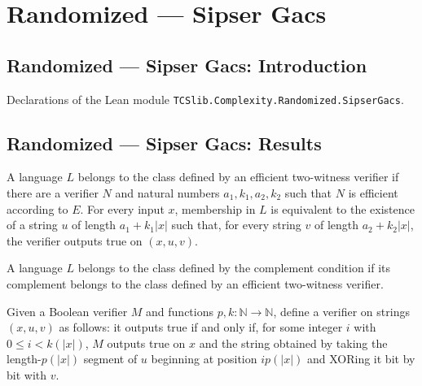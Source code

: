 \section{Randomized --- Sipser Gacs}
\subsection*{Randomized --- Sipser Gacs: Introduction}

Declarations of the Lean module \texttt{TCSlib.Complexity.Randomized.SipserGacs}.

\subsection*{Randomized --- Sipser Gacs: Results}

\begin{definition}
\label{Randomized.InSigma2}
\leanok
{}
A language $L$ belongs to the class defined by an efficient two-witness verifier if
there are a verifier $N$ and natural numbers $a_1,k_1,a_2,k_2$ such that $N$ is
efficient according to $E$. For every input $x$, membership in $L$ is equivalent to the
existence of a string $u$ of length $a_1+k_1|x|$ such that, for every string $v$ of
length $a_2+k_2|x|$, the verifier outputs true on $(x,u,v)$.
\end{definition}

\begin{definition}
\label{Randomized.InPi2}
\leanok
{}
A language $L$ belongs to the class defined by the complement condition if its
complement belongs to the class defined by an efficient two-witness verifier.
\end{definition}

\begin{definition}
\label{Randomized.shiftOrVerifier}
\leanok
Given a Boolean verifier $M$ and functions $p,k:\mathbb{N}\to\mathbb{N}$, define a
verifier on strings $(x,u,v)$ as follows: it outputs true if and only if, for some
integer $i$ with $0\le i<k(|x|)$, $M$ outputs true on $x$ and the string obtained by
taking the length-$p(|x|)$ segment of $u$ beginning at position $i p(|x|)$ and XORing it
bit by bit with $v$.
\end{definition}

